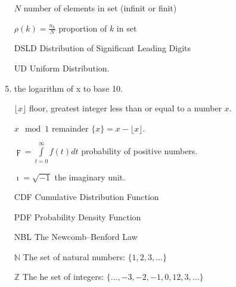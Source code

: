 \documentclass[titlepage,fleqn]{article}%
\begin{document}
\begin{enumerate}[align=right]
\item[$N$]  number of elements  in set (infinit or finit)
\item[$\rho(k)=\frac{n_k}{N}$]  proportion of  $k$  in set
\item[DSLD] Distribution of Significant Leading Digits
\item[UD] Uniform Distribution.
\item[$\displaystyle\log{x}=\frac{\ln{x}}{\ln{10}}%
$] the logarithm of x to base 10.
\item[$\displaystyle\lfloor{x}\rfloor
$] floor, greatest integer less than or equal to a number $x$.
\item[$x\mod{}1$]  remainder
$\{x\}=x-\lfloor{x}\rfloor$.
\item[$\digamma=\int\limits_{t=0}^\infty
f(t) dt$]  probability of positive numbers.
\item[$\imath=\sqrt{-1}$]  the imaginary unit.
\item[CDF]  Cumulative Distribution Function
\item[PDF]  Probability Density Function
\item[NBL]  The Newcomb--Benford Law \cite{formann0}
\item[$\mathbb{N}$] The set of natural numbers: $\{1, 2, 3, . . .\}$
\item[$\mathbb{Z}$] The he set of integers: $\{...,-3,-2,-1,0,1 2, 3, . . .\}$
\end{enumerate}%
\end{document}
